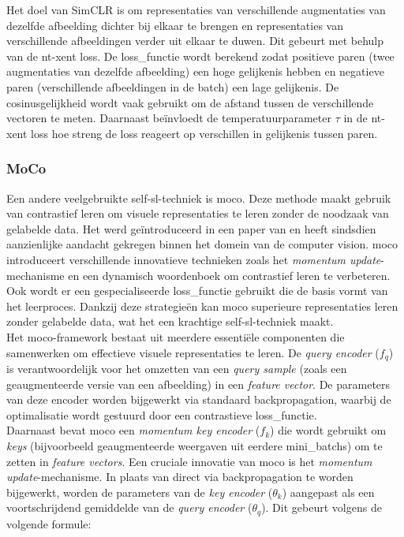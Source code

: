 Het doel van SimCLR is om representaties van verschillende augmentaties van dezelfde afbeelding dichter bij elkaar te brengen en representaties van verschillende afbeeldingen verder uit elkaar te duwen. Dit gebeurt met behulp van de \gls{nt-xent} loss. De \gls{loss_functie} wordt berekend zodat positieve paren (twee augmentaties van dezelfde afbeelding) een hoge gelijkenis hebben en negatieve paren (verschillende afbeeldingen in de \gls{batch}) een lage gelijkenis. De cosinusgelijkheid wordt vaak gebruikt om de afstand tussen de verschillende vectoren te meten. Daarnaast beïnvloedt de temperatuurparameter $\tau$ in de \gls{nt-xent} loss  hoe streng de loss reageert op verschillen in gelijkenis tussen paren.

\subsubsection{MoCo}

Een andere veelgebruikte \gls{self-sl}-techniek is \gls{moco}. Deze methode maakt gebruik van contrastief leren om visuele representaties te leren zonder de noodzaak van gelabelde data. Het werd geïntroduceerd in een paper van \textcite{He_2019} en heeft sindsdien aanzienlijke aandacht gekregen binnen het domein van de computer vision. \gls{moco} introduceert verschillende innovatieve technieken zoals het \emph{momentum update}-mechanisme en een dynamisch woordenboek om contrastief leren te verbeteren. Ook wordt er een gespecialiseerde \gls{loss_functie} gebruikt die de basis vormt van het leerproces. Dankzij deze strategieën kan \gls{moco} superieure representaties leren zonder gelabelde data, wat het een krachtige \gls{self-sl}-techniek maakt. \\

Het \gls{moco}-framework bestaat uit meerdere essentiële componenten die samenwerken om effectieve visuele representaties te leren. De \emph{query encoder} ($f_q$) is verantwoordelijk voor het omzetten van een \emph{query sample} (zoals een geaugmenteerde versie van een afbeelding) in een \emph{feature vector}. De parameters van deze encoder worden bijgewerkt via standaard backpropagation, waarbij de optimalisatie wordt gestuurd door een contrastieve \gls{loss_functie}. \autocite{Sowe_2025} \\

Daarnaast bevat \gls{moco} een \emph{momentum key encoder} ($f_k$) die wordt gebruikt om \emph{keys} (bijvoorbeeld geaugmenteerde weergaven uit eerdere \glspl{mini_batch}) om te zetten in \emph{feature vectors}. Een cruciale innovatie van \gls{moco} is het \emph{momentum update}-mechanisme. In plaats van direct via backpropagation te worden bijgewerkt, worden de parameters van de \emph{key encoder} ($\theta_k$) aangepast als een voortschrijdend gemiddelde van de \emph{query encoder} ($\theta_q$). Dit gebeurt volgens de volgende formule:

